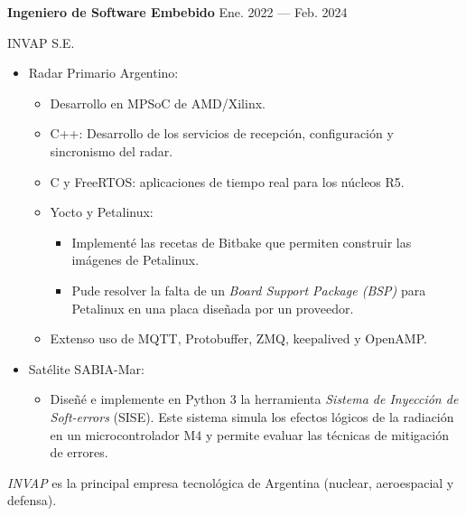 \bigskip
\parbox[t][][t]{\linewidth}{
	\parbox{\linewidth}{
		\textbf{Ingeniero de Software Embebido}
			\hfill
			{Ene. 2022 --- Feb. 2024}
		}
	\smallbreak
	\parbox{\linewidth}{INVAP S.E.}
	\smallbreak
	\begin{itemize}
		\item Radar Primario Argentino:
		\begin{itemize}
	    	\item{Desarrollo en MPSoC de AMD/Xilinx.}
			\item{C++: Desarrollo de los servicios de recepción, configuración y sincronismo del radar.}
			\item{C y FreeRTOS: aplicaciones de tiempo real para los núcleos R5.}
			\item{Yocto y Petalinux:}
			\begin{itemize}
				\item{Implementé las recetas de Bitbake que permiten construir las imágenes de Petalinux.}
				\item{Pude resolver la falta de un \emph{Board Support Package (BSP)} para Petalinux en una placa diseñada por un proveedor.}
			\end{itemize}
			\item{Extenso uso de MQTT, Protobuffer, ZMQ, keepalived y OpenAMP.}
		\end{itemize}
		\item Satélite SABIA-Mar:
		\begin{itemize}
	    	\item{Diseñé e implemente en Python 3 la herramienta \emph{Sistema de Inyección de Soft-errors} (SISE). Este sistema simula los efectos lógicos de la radiación en un microcontrolador M4 y permite evaluar las técnicas de mitigación de errores.}
		\end{itemize}
	\end{itemize}
	\smallbreak
    \emph{INVAP} es la principal empresa tecnológica de Argentina (nuclear, aeroespacial y defensa).
}


